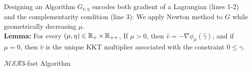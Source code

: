 \documentclass[8pt]{beamer}
\newcommand{\ouralgo}{\ensuremath{\mathcal{MSR}3}}
\begin{document}
\begin{frame}{Designing an Algorithm}
	$G_{\nu,\eta}$ encodes both gradient of a Lagrangian (lines 1-2) and the complementarity condition (line 3):
	We apply Newton method to $G$ while geometrically decreasing $\mu$. \\
\textbf{Lemma:} For every $(\mu,\eta) \in \operatorname{\mathbb{R}}_+\times\operatorname{\mathbb{R}}_{++}$,
If $\mu > 0$, then $\hat{v} = -\nabla\phi_\mu(\hat{\gamma})$, and if $\mu = 0$, then $\hat{v}$ is the unique KKT multiplier associated with the constraint $0 \leq \gamma$.
\end{frame}

\begin{frame}{$\ouralgo$-fast Algorithm}

\end{frame}
\end{document}
